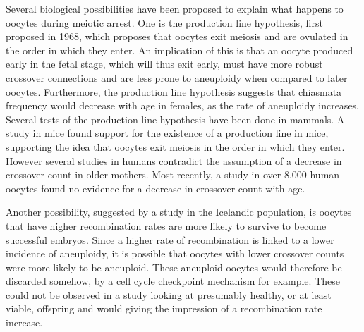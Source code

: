 
Several biological possibilities have been proposed to explain what happens to oocytes during meiotic arrest.
One is the production line hypothesis, first proposed in 1968\cite{Henderson1968}, which proposes that oocytes exit meiosis and are ovulated in the order in which they enter.
An implication of this is that an oocyte produced early in the fetal stage, which will thus exit early, must have more robust crossover connections and are less prone to aneuploidy when compared to later oocytes.
Furthermore, the production line hypothesis suggests that chiasmata frequency would decrease with age in females, as the rate of aneuploidy increases.
Several tests of the production line hypothesis have been done in mammals.
A study in mice found support for the existence of a production line in mice\cite{Polani1991}, supporting the idea that oocytes exit meiosis in the order in which they enter.
However several studies in humans contradict the assumption of a decrease in crossover count in older mothers\cite{Kong2004,Martin2015}.
Most recently, a study in over 8,000 human oocytes found no evidence for a decrease in crossover count with age.

Another possibility, suggested by a study in the Icelandic population\cite{Kong2004}, is oocytes that have higher recombination rates are more likely to survive to become successful embryos.
Since a higher rate of recombination is linked to a lower incidence of aneuploidy, it is possible that oocytes with lower crossover counts were more likely to be aneuploid.
These aneuploid oocytes would therefore be discarded somehow, by a cell cycle checkpoint mechanism for example.
These could not be observed in a study looking at presumably healthy, or at least viable, offspring and would giving the impression of a recombination rate increase.

